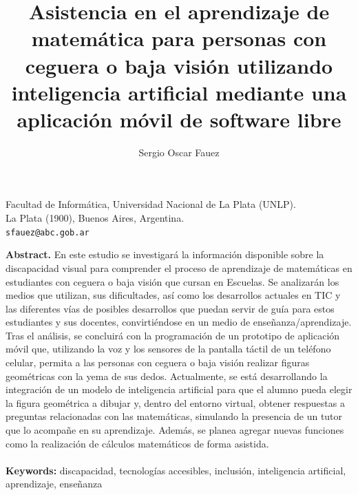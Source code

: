 \documentclass{article}
\date{}
\title{\vspace{-1.5cm}\fontsize{14pt}{28pt}\selectfont\textbf{Asistencia en el aprendizaje de matemática para personas con ceguera o baja visión utilizando inteligencia artificial mediante una aplicación móvil de software libre}}
\author{\fontsize{10pt}{12pt}\selectfont Sergio Oscar Fauez}
\begin{document}

\maketitle

\vspace{-0.7cm}

\begin{center}
Facultad de Informática, Universidad Nacional de La Plata (UNLP).\\ 
La Plata (1900), Buenos Aires, Argentina.\\
\texttt{sfauez@abc.gob.ar}
\end{center}
	

\begin{adjustwidth}{0.7cm}{0.7cm}
	{\changefontsizes{8.5pt}
	\textbf{Abstract.} En este estudio se investigará la información disponible sobre la discapacidad visual para comprender el proceso de aprendizaje de matemáticas en estudiantes con ceguera o baja visión que cursan en Escuelas. Se analizarán los medios que utilizan, sus dificultades, así como los desarrollos actuales en TIC y las diferentes vías de posibles desarrollos que puedan servir de guía para estos estudiantes y sus docentes, convirtiéndose en un medio de \textnormal{enseñanza/aprendizaje}. Tras el análisis, se concluirá con la programación de un prototipo de aplicación móvil que, utilizando la voz y los sensores de la pantalla táctil de un teléfono celular, permita a las personas con ceguera o baja visión realizar figuras geométricas con la yema de sus dedos. Actualmente, se está desarrollando la integración de un modelo de inteligencia artificial para que el alumno pueda elegir la figura geométrica a dibujar y, dentro del entorno virtual, obtener respuestas a preguntas relacionadas con las matemáticas, simulando la presencia de un tutor que lo acompañe en su aprendizaje. Además, se planea agregar nuevas funciones como la realización de cálculos matemáticos de forma asistida.\\\\
	\textbf{Keywords:} discapacidad, tecnologías accesibles, inclusión, inteligencia artificial, aprendizaje, enseñanza
	}
\end{adjustwidth}
\end{document}
